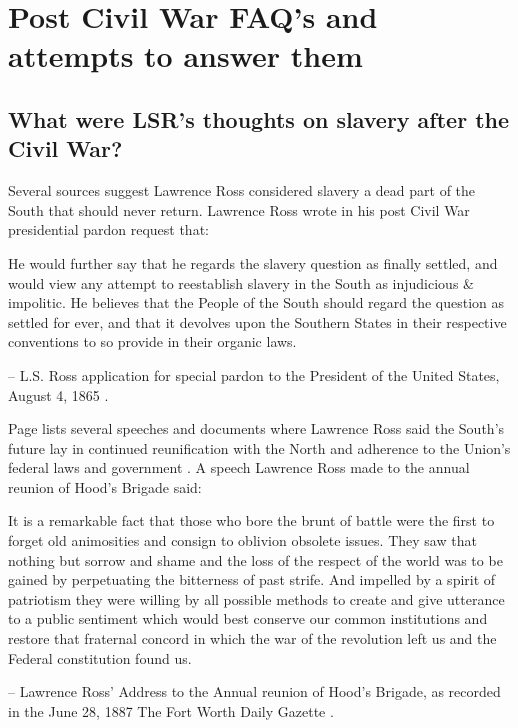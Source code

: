 \documentclass[12pt]{article}
\begin{document}
\newpage
\section{Post Civil War FAQ's and attempts to answer them}

\subsection{What were LSR's thoughts on slavery after the Civil War?}
Several sources suggest Lawrence Ross considered slavery a dead part of the South that should never return. Lawrence Ross wrote in his post Civil War presidential pardon request that:

\begin{displayquote}
He would further say that he regards the slavery question as finally settled, and would view any attempt to reestablish slavery in the South as injudicious \& impolitic.  He believes that the People of the South should regard the question as settled for ever, and that it devolves upon the Southern States in their respective conventions to so provide in their organic laws.

-- L.S. Ross application for special pardon to the President of the United States, August 4, 1865 \cite{pardonrequest}.
\end{displayquote}

Page lists several speeches and documents where Lawrence Ross said the South's future lay in continued reunification with the North and adherence to the Union's federal laws and government \cite[pg. 161--167]{page}. A speech Lawrence Ross made to the annual reunion of Hood's Brigade said:

\begin{displayquote}
It is a remarkable fact that those who bore the brunt of battle were the first to forget old animosities and consign to oblivion obsolete issues.  They saw that nothing but sorrow and shame and the loss of the respect of the world was to be gained by perpetuating the bitterness of past strife.  And impelled by a spirit of patriotism they were willing by all possible methods to create and give utterance to a public sentiment which would best conserve our common institutions and restore that fraternal concord in which the war of the revolution left us and the Federal constitution found us.

-- Lawrence Ross' Address to the Annual reunion of Hood's Brigade, as recorded in the June 28, 1887 The Fort Worth Daily Gazette \cite{fwg:1887-06-28}.
\end{displayquote}
\end{document}
